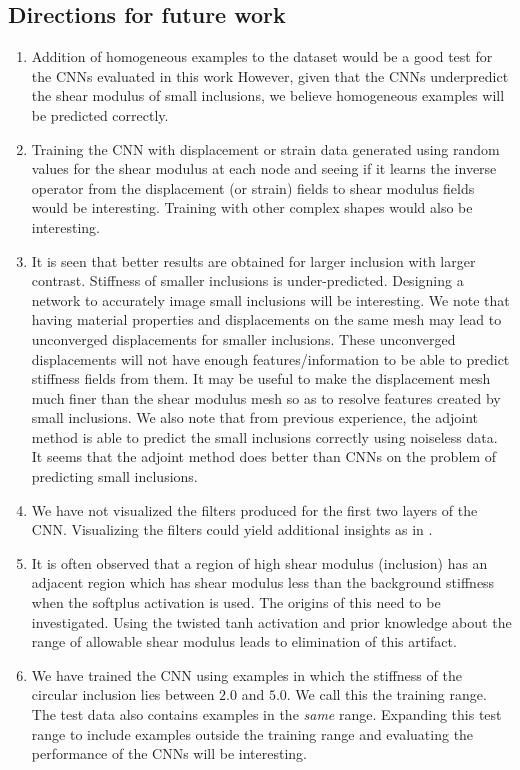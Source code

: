 \documentclass[12pt]{article}
\begin{document}
\subsection{Directions for future work}
\begin{enumerate}
\item{Addition of homogeneous examples to the dataset would be a good test for the CNNs evaluated in this work However, given that the CNNs underpredict the shear modulus of small inclusions, we believe homogeneous examples will be predicted correctly.}
\item{Training the CNN with displacement or strain data generated using random values for the shear modulus at each node and seeing if it learns the inverse operator from the displacement (or strain) fields to shear modulus fields would be interesting. Training with other complex shapes would also be interesting.}
\item{It is seen that better results are obtained for larger inclusion with larger contrast. Stiffness of smaller inclusions is under-predicted. Designing a network to accurately image small inclusions will be interesting. We note that having material properties and displacements on the same mesh may lead to unconverged displacements for smaller inclusions. These unconverged displacements will not have enough features/information to be able to predict stiffness fields from them. It may be useful to make the displacement mesh much finer than the shear modulus mesh so as to resolve features created by small inclusions. We also note that from previous experience, the adjoint method \cite{paper:oberai2003} is able to predict the small inclusions correctly using noiseless data. It seems that the adjoint method does better than CNNs on the problem of predicting small inclusions.}
\item{We have not visualized the filters produced for the first two layers of the CNN. Visualizing the filters could yield additional insights as in \cite{paper:pateloberai2019}.}
\item{It is often observed that a region of high shear modulus (inclusion) has an adjacent region which has shear modulus less than the background stiffness when the softplus activation is used. The origins of this need to be investigated. Using the twisted tanh activation and prior knowledge about the range of allowable shear modulus leads to elimination of this artifact.}
\item{We have trained the CNN using examples in which the stiffness of the circular inclusion lies between $2.0$ and $5.0$. We call this the training range. The test data also contains examples in the \textit{same} range. Expanding this test range to include examples outside the training range and evaluating the performance of the CNNs will be interesting.}

\end{enumerate}
\end{document}
